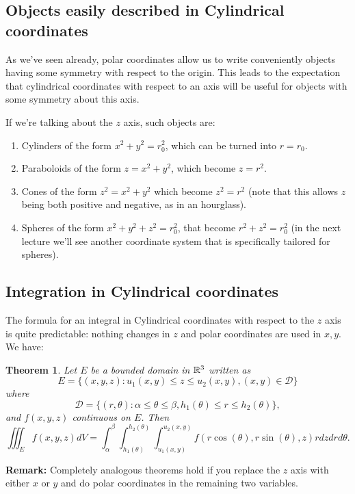 \documentclass[12pt]{article}
\renewcommand{\D}{\mathcal{D}}
\newcommand{\triple}{\iiint_E f(x,y,z)dV}
\newtheorem{theorem}{Theorem}
\begin{document}
\subsection*{Objects easily described in Cylindrical coordinates}
As we've seen already, polar coordinates allow us to write conveniently objects having some symmetry with respect to the origin. This leads to the expectation that cylindrical coordinates with respect to an axis will be useful for objects with some symmetry about this axis.

If we're talking about the $z$ axis, such objects are:
\begin{enumerate}
\item Cylinders of the form $x^2+y^2=r_0^2$, which can be turned into $r=r_0$.
\item Paraboloids of the form $z=x^2+y^2$, which become $z=r^2$.
\item Cones of the form $z^2=x^2+y^2$ which become $z^2=r^2$ (note that this allows $z$ being both positive and negative, as in an hourglass).
\item Spheres of the form $x^2+y^2+z^2=r_0^2$, that become $r^2+z^2=r_0^2$ (in the next lecture we'll see another coordinate system that is specifically tailored for spheres).
\end{enumerate}

\subsection*{Integration in Cylindrical coordinates}
The formula for an integral in Cylindrical coordinates with respect to the $z$ axis is quite predictable: nothing changes in $z$ and polar coordinates are used in $x, y$. We have:
\begin{theorem}
Let $E$ be a bounded domain in $\mathbb{R}^3$ written as $$E=\{(x,y,z): u_1(x,y)\leq z\leq u_2(x,y), (x,y)\in\D\}$$ where $$\D=\{(r,\theta):\alpha \leq \theta \leq \beta, h_1(\theta)\leq r\leq h_2(\theta)\},$$ and $f(x,y,z)$ continuous on $E$. Then $$\triple=\int_\alpha^\beta \int_{h_1(\theta)}^{h_2(\theta)}\int_{u_1(x,y)}^{u_2(x,y)} f(r\cos(\theta),r\sin(\theta),z)rdzdrd\theta.$$
\end{theorem}

\textbf{Remark:} Completely analogous theorems hold if you replace the $z$ axis with either $x$ or $y$ and do polar coordinates in the remaining two variables.
\end{document}
